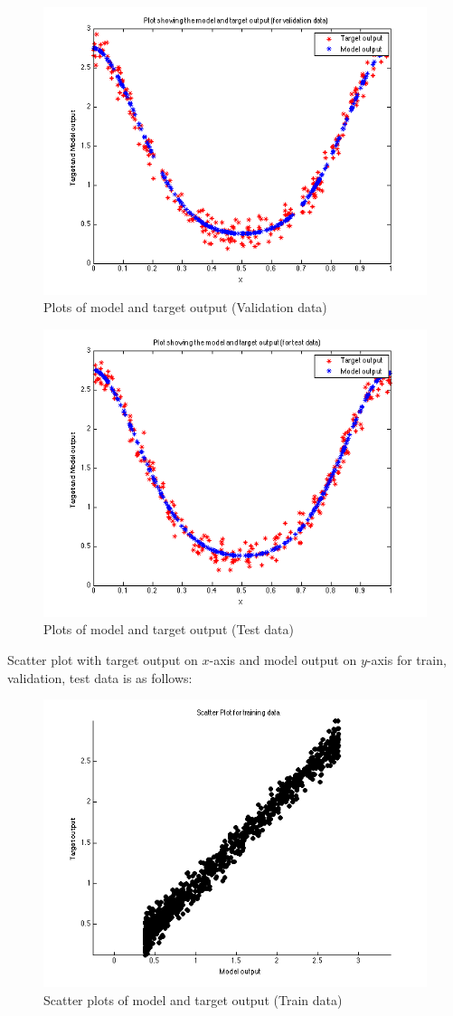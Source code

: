 \documentclass{article}
\begin{document}
\begin{figure}[H]
\centering
\includegraphics[width=0.5\linewidth]{Regression/rbfnn_univariate/output_val.png}
\caption{Plots of model and target output (Validation data)}
\end{figure}

\begin{figure}[H]
\centering
\includegraphics[width=0.5\linewidth]{Regression/rbfnn_univariate/output_test.png}
\caption{Plots of model and target output (Test data)}
\end{figure}

Scatter plot with target output on $x$-axis and model output on $y$-axis for train, validation, test data is as follows:

\begin{figure}[H]
\centering
\includegraphics[width=0.5\linewidth]{Regression/rbfnn_univariate/scatter_train.png}
\caption{Scatter plots of model and target output (Train data)}
\end{figure}
\end{document}
